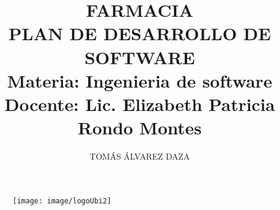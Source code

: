 \documentclass[10pt,letterpaper]{report}
\author{TOMÁS ÁLVAREZ DAZA}
\begin{document}
\begin{titlepage}
	\begin{figure}
		\texttt{[image: image/logoUbi2]}
	\end{figure}
	\title{FARMACIA\\
	\textbf{PLAN DE DESARROLLO DE SOFTWARE}\\
	\textbf{Materia:} Ingenieria de software\\ 
	\textbf{Docente:}  Lic. Elizabeth Patricia Rondo Montes
 }
	
\end{titlepage}
\maketitle

\tableofcontents


\appendix



\end{document}
